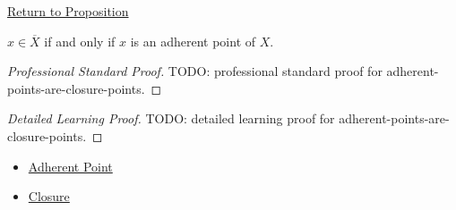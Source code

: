 \newpage
{}
\label{prf:adherent-points-are-closure-points}

\begin{remark*}[Return]
\hyperref[prop:adherent-points-are-closure-points]{Return to Proposition}
\end{remark*}

\begin{proposition*}
\(x\in\overline{X}\) if and only if \(x\) is an adherent point of \(X\).
\end{proposition*}

\begin{proof}[Professional Standard Proof]
\LRAProofBodyStart
TODO: professional standard proof for adherent-points-are-closure-points.
\end{proof}

\begin{proof}[Detailed Learning Proof]
\LRAProofBodyStart
TODO: detailed learning proof for adherent-points-are-closure-points.
\end{proof}

\begin{remark*}
\end{remark*}

\begin{dependencies}
\begin{itemize}
  \item \hyperref[def:adherent-point-r]{Adherent Point}
  \item \hyperref[def:closure-r]{Closure}
\end{itemize}
\end{dependencies}

\clearpage
